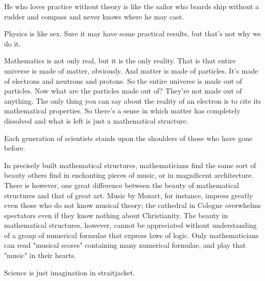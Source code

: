 \documentclass[12pt,a4paper,twoside,openright]{report}
\theoremstyle{definition}
\theoremstyle{itexmp}
\numberwithin{equation}{section}
\begin{document}
	\begin{fquote}He who loves practice without theory is like the sailor who boards ship without a rudder and compass and never knows where he may cast.
 	\end{fquote}
 	
	\begin{fquote}Physics is like sex. Sure it may have some practical results, but that's not why we do it.
 	\end{fquote}
 	
	\begin{fquote}Mathematics is not only real, but it is the only reality. That is that entire universe is made of matter, obviously. And matter is made of particles. It's made of electrons and neutrons and protons. So the entire universe is made out of particles. Now what are the particles made out of? They're not made out of anything. The only thing you can say about the reality of an electron is to cite its mathematical properties. So there's a sense in which matter has completely dissolved and what is left is just a mathematical structure.
 	\end{fquote}
 	
 	\begin{fquote}Each generation of scientists stands upon the shoulders of those who have gone before.
 	\end{fquote}
 	
 	\begin{fquote}In precisely built mathematical structures, mathematicians find the same sort of beauty others find in enchanting pieces of music, or in magnificent architecture. There is however, one great difference between the beauty of mathematical structures and that of great art. Music by Mozart, for instance, impress greatly even those who do not know musical theory; the cathedral in Cologne overwhelms spectators even if they know nothing about Christianity. The beauty in mathematical structures, however, cannot be appreciated without understanding of a group of numerical formulae that express laws of logic. Only mathematicians can read "musical scores" containing many numerical formulae, and play that "music" in their hearts.
 	\end{fquote}
 	
 	 \begin{fquote}Science is just imagination in straitjacket.
 	\end{fquote}
 	
\end{document}
